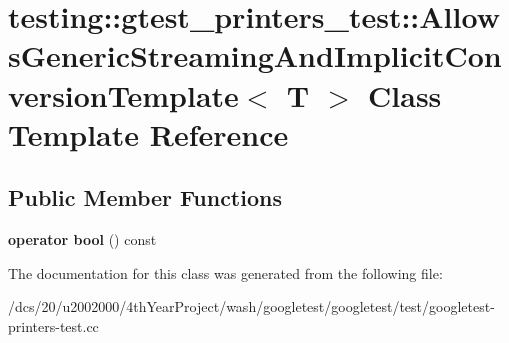 \hypertarget{classtesting_1_1gtest__printers__test_1_1AllowsGenericStreamingAndImplicitConversionTemplate}{}\section{testing\+:\+:gtest\+\_\+printers\+\_\+test\+:\+:Allows\+Generic\+Streaming\+And\+Implicit\+Conversion\+Template$<$ T $>$ Class Template Reference}
\label{classtesting_1_1gtest__printers__test_1_1AllowsGenericStreamingAndImplicitConversionTemplate}
\subsection*{Public Member Functions}
\begin{DoxyCompactItemize}
\item 
\mbox{\label{classtesting_1_1gtest__printers__test_1_1AllowsGenericStreamingAndImplicitConversionTemplate_af5f8ea44d7d86283b4c004a994ddd7f9}} 
{\bfseries operator bool} () const
\end{DoxyCompactItemize}


The documentation for this class was generated from the following file\+:\begin{DoxyCompactItemize}
\item 
/dcs/20/u2002000/4th\+Year\+Project/wash/googletest/googletest/test/googletest-\/printers-\/test.\+cc\end{DoxyCompactItemize}
